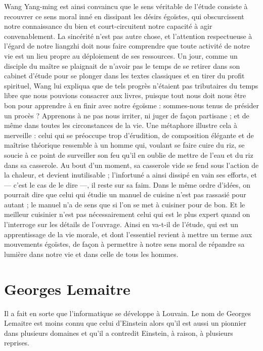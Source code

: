 \documentclass[11pt,a4paper]{article} %
\begin{document}
Wang Yang-ming est ainsi convaincu que le sens véritable de l'étude consiste à recouvrer ce sens moral inné en dissipant les désirs égoïstes, qui obscurcissent notre
connaissance du bien et court-circuitent notre capacité à agir convenablement.
La sincérité n'est pas autre chose, et l'attention respectueuse à l'égard de notre liangzhi
doit nous faire comprendre que toute activité de notre vie est un lieu propre au déploiement de ses ressources.
Un jour, comme un disciple du maître se plaignait de n'avoir
pas le temps de se retirer dans son cabinet d'étude pour se plonger dans les textes classiques et en tirer du profit spirituel, Wang lui expliqua que de tels progrès n'étaient pas
tributaires du temps libre que nous pouvions consacrer aux livres, puisque tout nous doit
nous être bon pour apprendre à en finir avec notre égoïsme : sommes-nous tenus de présider un procès ? Apprenons à ne pas nous irriter, ni juger de façon partisane ; et de
même dans toutes les circonstances de la vie.
Une métaphore illustre cela à merveille :
celui qui se préoccupe trop d'érudition, de composition élégante et de maîtrise théorique
ressemble à un homme qui, voulant se faire cuire du riz, se soucie à ce point de surveiller son feu qu'il en oublie de mettre de l'eau et du riz dans sa casserole.
Au bout d'un
moment, sa casserole vide se fend sous l'action de la chaleur, et devient inutilisable ;
l'infortuné a ainsi dissipé en vain ses efforts, et --- c'est le cas de le dire ---, il reste sur sa
faim.
Dans le même ordre d'idées, on pourrait dire que celui qui étudie un manuel de
cuisine n'est pas rassasié pour autant ; le manuel n'a de sens que si l'on se met à cuisiner pour de bon.
Et le meilleur cuisinier n'est pas nécessairement celui qui est le plus
expert quand on l'interroge sur les détails de l'ouvrage.
Ainsi en va-t-il de l'étude,
qui est un apprentissage de la vie morale, et dont l'essentiel revient à mettre un terme
aux mouvements égoïstes, de façon à permettre à notre sens moral de répandre sa lumière dans notre vie et dans celle de tous les hommes.

\part{Georges Lemaitre}
Il a fait en sorte que l'informatique se développe à Louvain.
Le nom de Georges Lemaitre est moins connu que celui d'Einstein alors qu'il est aussi un pionnier dans plusieurs domaines et qu'il a contredit Einstein, à raison, à plusieurs reprises.
\end{document}
